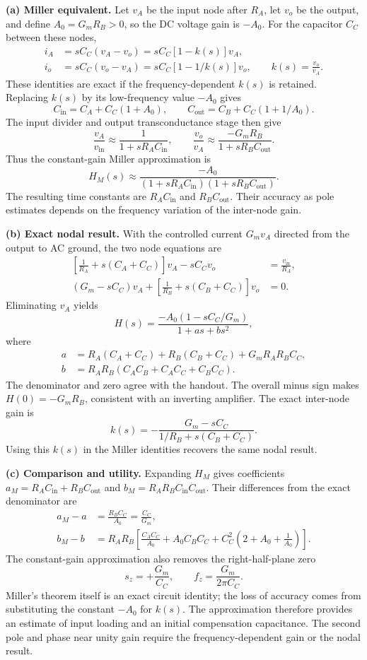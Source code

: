 \documentclass[12pt,letterpaper]{article}
\begin{document}
\begin{enumerate}
\textbf{(a) Miller equivalent.}
Let $v_A$ be the input node after $R_A$, let $v_o$ be the output,
and define $A_0=G_mR_B>0$, so the DC voltage gain is $-A_0$.
For the capacitor $C_C$ between these nodes,
\begin{align*}
i_A&=sC_C(v_A-v_o)=sC_C[1-k(s)]v_A,\\
i_o&=sC_C(v_o-v_A)=sC_C[1-1/k(s)]v_o,
\qquad k(s)=\frac{v_o}{v_A}.
\end{align*}
These identities are exact if the frequency-dependent $k(s)$ is retained.
Replacing $k(s)$ by its low-frequency value $-A_0$ gives
\[
\boxed{C_{\mathrm{in}}=C_A+C_C(1+A_0),\qquad
C_{\mathrm{out}}=C_B+C_C(1+1/A_0).}
\]
The input divider and output transconductance stage then give
\[
\frac{v_A}{v_{\mathrm{in}}}\approx
\frac{1}{1+sR_AC_{\mathrm{in}}},\qquad
\frac{v_o}{v_A}\approx
\frac{-G_mR_B}{1+sR_BC_{\mathrm{out}}}.
\]
Thus the constant-gain Miller approximation is
\[
\boxed{H_M(s)\approx
\frac{-A_0}
{(1+sR_AC_{\mathrm{in}})(1+sR_BC_{\mathrm{out}})}.}
\]
The resulting time constants are $R_AC_{\mathrm{in}}$ and
$R_BC_{\mathrm{out}}$. Their accuracy as pole estimates depends on
the frequency variation of the inter-node gain.

\textbf{(b) Exact nodal result.}
With the controlled current $G_mv_A$ directed from the output to
AC ground, the two node equations are
\begin{align*}
\left[\frac{1}{R_A}+s(C_A+C_C)\right]v_A-sC_Cv_o
 &=\frac{v_{\mathrm{in}}}{R_A},\\
(G_m-sC_C)v_A+
\left[\frac{1}{R_B}+s(C_B+C_C)\right]v_o&=0.
\end{align*}
Eliminating $v_A$ yields
\[
\boxed{H(s)=\frac{-A_0(1-sC_C/G_m)}{1+a s+b s^2},}
\]
where
\begin{align*}
a&=R_A(C_A+C_C)+R_B(C_B+C_C)+G_mR_AR_BC_C,\\
b&=R_AR_B(C_AC_B+C_AC_C+C_BC_C).
\end{align*}
The denominator and zero agree with the handout. The overall
minus sign makes $H(0)=-G_mR_B$, consistent with an inverting amplifier.
The exact inter-node gain is
\[
k(s)=-\frac{G_m-sC_C}{1/R_B+s(C_B+C_C)}.
\]
Using this $k(s)$ in the Miller identities recovers the same nodal result.

\newpage
\textbf{(c) Comparison and utility.}
Expanding $H_M$ gives coefficients
$a_M=R_AC_{\mathrm{in}}+R_BC_{\mathrm{out}}$ and
$b_M=R_AR_BC_{\mathrm{in}}C_{\mathrm{out}}$.
Their differences from the exact denominator are
\begin{align*}
a_M-a&=\frac{R_BC_C}{A_0}=\frac{C_C}{G_m},\\
b_M-b&=R_AR_B\left[
\frac{C_AC_C}{A_0}+A_0C_BC_C
+C_C^2\left(2+A_0+\frac{1}{A_0}\right)\right].
\end{align*}
The constant-gain approximation also removes the right-half-plane zero
\[
\boxed{s_z=+\frac{G_m}{C_C},\qquad
f_z=\frac{G_m}{2\pi C_C}.}
\]
Miller's theorem itself is an exact circuit identity; the loss of
accuracy comes from substituting the constant $-A_0$ for $k(s)$.
The approximation therefore provides an estimate of input loading
and an initial compensation capacitance. The second pole and phase
near unity gain require the frequency-dependent gain or the nodal result.


\end{enumerate}
\end{document}
